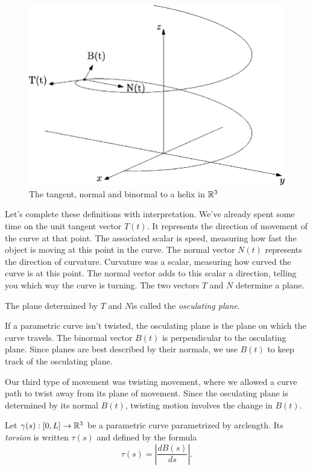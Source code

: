 \documentclass[fleqn,letterpaper]{report}
\begin{document}
\begin{figure}[t]
\centering
\includegraphics[width=12cm]{figure22.eps}
\caption{The tangent, normal and binormal to a helix in
$\mathbb{R}^3$}
\label{figure-three-unit-vectors}
\end{figure} 

Let's complete these definitions with interpretation.
We've already spent some time on the unit tangent vector
$T(t)$. It represents the direction of movement of the curve at
that point. The associated scalar is speed, measuring how fast
the object is moving at this point in the curve.
The normal vector $N(t)$ represents the direction of
curvature. Curvature was a scalar, measuring how curved the
curve is at this point. The normal vector adds to this scalar a
direction, telling you which way the curve is turning. The two
vectors $T$ and $N$ determine a plane. 

\begin{defn}
The plane determined by $T$ and $N$is called the
\emph{osculating plane}. 
\end{defn}
If a parametric curve isn't twisted, the osculating plane is
the plane on which the curve travels.  The binormal vector
$B(t)$ is perpendicular to the osculating plane. Since planes
are best described by their normals, we use $B(t)$ to keep
track of the osculating plane.

Our third type of movement was twisting movement, where we
allowed a curve path to twist away from its plane of movement.
Since the osculating plane is determined by its normal $B(t)$,
twisting motion involves the change in $B(t)$. 

\begin{defn}
Let $\gamma(s): [0,L] \rightarrow \mathbb{R}^3$ be a parametric curve
parametrized by arclength. Its \emph{torsion} is written
$\tau(s)$ and defined by the formula
\begin{equation*}
\tau(s) = \left| \frac{d B(s)}{ds} \right|.
\end{equation*}
\end{defn}
\end{document}
